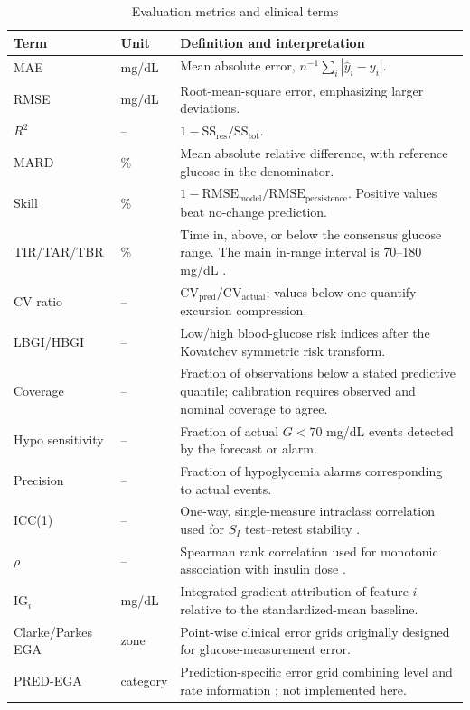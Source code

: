 \documentclass[journal]{IEEEtran}
\begin{document}
\begin{table}[t]
\centering
\caption{Evaluation metrics and clinical terms}
\label{tab:metrics}
\footnotesize
\begin{tabular}{llp{12.3cm}}
\toprule
Term & Unit & Definition and interpretation \\
\midrule
MAE & mg/dL & Mean absolute error, $n^{-1}\sum_i |\hat{y}_i - y_i|$. \\
RMSE & mg/dL & Root-mean-square error, emphasizing larger deviations. \\
$R^2$ & -- & $1 - \text{SS}_{\text{res}}/\text{SS}_{\text{tot}}$. \\
MARD & \% & Mean absolute relative difference, with reference glucose in the denominator. \\
Skill & \% & $1 - \text{RMSE}_{\text{model}}/\text{RMSE}_{\text{persistence}}$. Positive values beat no-change prediction. \\
TIR/TAR/TBR & \% & Time in, above, or below the consensus glucose range. The main in-range interval is 70--180 mg/dL \cite{ref52}. \\
CV ratio & -- & $\text{CV}_{\text{pred}}/\text{CV}_{\text{actual}}$; values below one quantify excursion compression. \\
LBGI/HBGI & -- & Low/high blood-glucose risk indices after the Kovatchev symmetric risk transform. \\
Coverage & -- & Fraction of observations below a stated predictive quantile; calibration requires observed and nominal coverage to agree. \\
Hypo sensitivity & -- & Fraction of actual $G<70$ mg/dL events detected by the forecast or alarm. \\
Precision & -- & Fraction of hypoglycemia alarms corresponding to actual events. \\
ICC(1) & -- & One-way, single-measure intraclass correlation used for $S_I$ test--retest stability \cite{ref50}. \\
$\rho$ & -- & Spearman rank correlation used for monotonic association with insulin dose \cite{ref51}. \\
$\text{IG}_i$ & mg/dL & Integrated-gradient attribution of feature $i$ relative to the standardized-mean baseline. \\
Clarke/Parkes EGA & zone & Point-wise clinical error grids originally designed for glucose-measurement error. \\
PRED-EGA & category & Prediction-specific error grid combining level and rate information \cite{ref53}; not implemented here. \\
\bottomrule
\end{tabular}
\end{table}
\end{document}
